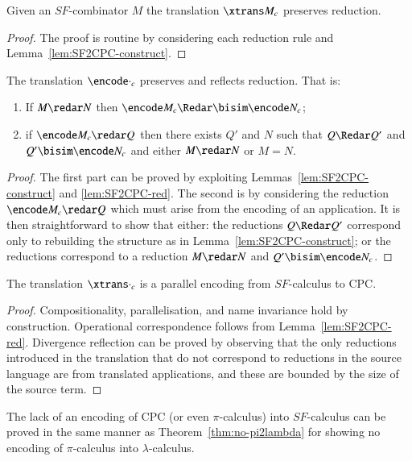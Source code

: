 \documentclass{llncs}
\begin{document}
\begin{lemma}
\label{lem:SF2CPC-red}
Given an $SF$-combinator $M$ the translation $\xtrans M _c$ preserves reduction.
\end{lemma}
\begin{proof}
The proof is routine 
by considering each reduction rule and Lemma~\ref{lem:SF2CPC-construct}.
\end{proof}

\begin{lemma}
\label{lem:sf2cpc-red}
The translation $\encode \cdot _c$ preserves and reflects reduction. That is:
\begin{enumerate}
\item If $M\redar N$ then $\encode M _c \Redar\bisim \encode N _c$;
\item if $\encode M _c \redar Q$ then there exists $Q'$ and $N$ such that
      $Q\Redar Q'$ and $Q'\bisim \encode N _c$ and either $M\redar N$ or $M=N$.
\end{enumerate}
\end{lemma}
\begin{proof}
The first part can be proved by exploiting Lemmas~\ref{lem:SF2CPC-construct} and \ref{lem:SF2CPC-red}.
The second is by considering the reduction $\encode M _c\redar Q$ which must arise
from the encoding of an application.
It is then straightforward to show that either:
the reductions $Q\Redar Q'$ correspond only to rebuilding the structure as in
Lemma~\ref{lem:SF2CPC-construct}; or
the reductions correspond to a reduction $M\redar N$ and $Q'\bisim\encode N _c$.
\end{proof}


\begin{theorem}
\label{thm:SF2CPC}
The translation $\xtrans\cdot _c$ is a parallel encoding from $SF$-calculus to CPC.
\end{theorem}
\begin{proof}
Compositionality, parallelisation, and name invariance hold by construction.
Operational correspondence follows from Lemma~\ref{lem:SF2CPC-red}.
Divergence reflection can be proved by observing that the only reductions introduced
in the translation that do not correspond to reductions in the source language are
from translated applications, and these are bounded by the size of the source term.
\end{proof}


The lack of an encoding of CPC (or even $\pi$-calculus) into $SF$-calculus can be
proved in the same manner as Theorem~\ref{thm:no-pi2lambda} for showing no encoding
of $\pi$-calculus into $\lambda$-calculus.
\end{document}
